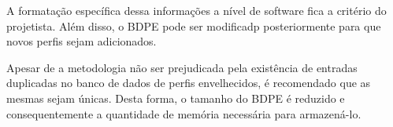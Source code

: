 A formatação específica dessa informações a nível de software fica a critério do projetista. Além disso, o BDPE pode ser modificadp posteriormente para que novos perfis sejam adicionados.

Apesar de a metodologia não ser prejudicada pela existência de entradas duplicadas no banco de dados de perfis envelhecidos, é recomendado que as mesmas sejam únicas. Desta forma, o tamanho do BDPE é reduzido e consequentemente a quantidade de memória necessária para armazená-lo.

